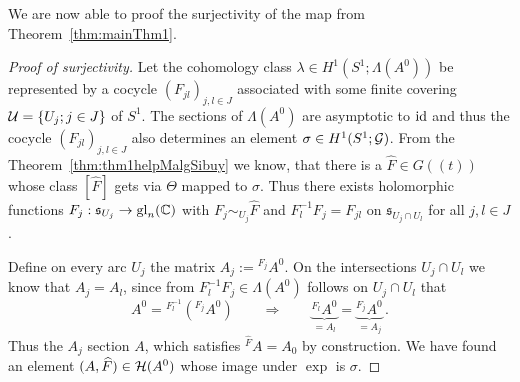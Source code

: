 We are now able to proof the surjectivity of the map from
Theorem~\ref{thm:mainThm1}.
\begin{proof}[Proof of surjectivity]
  Let the cohomology class $\lambda\in H^1(S^1;\Lambda(A^0))$ be represented by
  a cocycle $(F_{jl})_{j,l\in J}$ associated with some finite covering
  $\mathcal{U}=\{U_j;j\in J\}$ of $S^1$.
  The sections of $\Lambda(A^0)$ are asymptotic to $\operatorname{id}$ and thus the cocycle
  $(F_{jl})_{j,l\in J}$ also determines an element $\sigma\in H^1(S^1;\mathcal{G})$.
  From the Theorem~\ref{thm:thm1helpMalgSibuy} we know, that there is a
  $\hat F\in G(\!(t)\!)$ whose class $[\hat F]$ gets via $\Theta$ mapped to
  $\sigma$.
  Thus there exists holomorphic functions $F_j:\mathfrak{s}_{U_j}\to\operatorname{gl}_n(\mathbb{C})$
  with $F_j\sim_{U_j}\hat F$ and $F_l^{-1}F_j=F_{jl}$ on
  $\mathfrak{s}_{U_j\cap U_l}$ for all $j,l\in J$.

  Define on every arc $U_j$ the matrix $A_j:={}^{F_j}A^0$.
  On the intersections $U_j\cap U_l$ we know that $A_j=A_l$, since
  from $F_l^{-1}F_j\in\Lambda(A^0)$ follows on $U_j\cap U_l$ that
  \[
    A^0={}^{F_l^{-1}}({}^{F_j}A^0)
    \qquad\Longrightarrow{}\qquad
    \underset{=A_l}{\underbrace{{}^{F_l}A^0}}
    =\underset{=A_j}{\underbrace{{}^{F_j}A^0}}
    \,.
  \]
  Thus the $A_j$  section $A$, which satisfies
  ${}^{\hat F}A=A_0$ by construction.
  We have found an element $(A,\widehat F)\in\mathcal{H}(A^0)$ whose image under $\exp$ is
  $\sigma$.
\end{proof}

